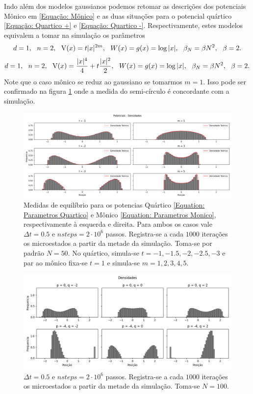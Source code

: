 Indo além dos modelos gaussianos podemos retomar as descrições dos potenciais Mônico em \ref{Equação: Mônico} e as duas situações para o potencial quártico \ref{Equação: Quartico +} e \ref{Equação: Quartico -}. Respectivamente, estes modelos equivalem a tomar na simulação os parâmetros
\begin{equation}
	d = 1, \ \  n = 2, \ \ \V(x)= t |x|^{2m}, \ \ W(x) = g(x) = \log{|x|}, \ \ \beta_N = \beta N^2, \ \ \beta = 2.
	\label{Equation: Parametros Monico}
\end{equation}
\begin{equation}
	d = 1, \ \  n = 2, \ \ \V(x)=\frac{|x|^4}{4} + t \frac{|x|^2}{2}, \ \ W(x) = g(x) = \log{|x|}, \ \ \beta_N = \beta N^2, \ \ \beta = 2.
	\label{Equation: Parametros Quartico}
\end{equation}
Note que o caso mônico se reduz ao gaussiano se tomarmos $m=1$. Isso pode ser confirmado na figura \ref{Figura: Quartic Monic} onde a medida do semi-círculo é concordante com a simulação.
\begin{figure}[ht]
	\includegraphics[width=\textwidth]{Assets/validationQuarticMonic-alt.png}
	\caption{Medidas de equilíbrio para os potencias Quártico \ref{Equation: Parametros Quartico} e Mônico \ref{Equation: Parametros Monico}, respectivamente à esquerda e direita. Para ambos os casos vale $\Delta t = 0.5$ e $nsteps = 2\cdot10^6$ passos. Registra-se a cada $1000$ iterações os microestados a partir da metade da simulação. Toma-se por padrão $N=50$. No quártico, simula-se $t=-1,-1.5,-2,-2.5,-3$ e par ao mônico fixa-se $t=1$ e simula-se $m=1,2,3,4,5$.}
	\label{Figura: Quartic Monic}
\end{figure}

\begin{figure}[ht]
	\includegraphics[width=\textwidth]{Assets/Validationx3.png}
	\caption{ $\Delta t = 0.5$ e $nsteps = 2\cdot10^6$ passos. Registra-se a cada $1000$ iterações os microestados a partir da metade da simulação. Toma-se $N=100$.}
	\label{Figura: V3}
\end{figure}

